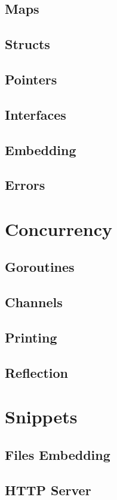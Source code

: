 \subsection{Maps}
\raggedbottom
\subsection{Structs}
\raggedbottom
\subsection{Pointers}
\raggedbottom
\subsection{Interfaces}
\raggedbottom
\subsection{Embedding}
\raggedbottom
\subsection{Errors}
\raggedbottom
\hrulefill

\section{Concurrency}
\subsection{Goroutines}
\raggedbottom
\subsection{Channels}
\raggedbottom
\subsection{Printing}
\raggedbottom
\subsection{Reflection}
\raggedbottom
\hrulefill

\section{Snippets}
\subsection{Files Embedding}
\raggedbottom
\subsection{HTTP Server}
\raggedbottom
\hrulefill

